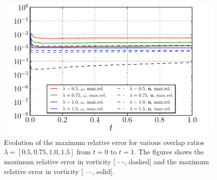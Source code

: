 	\begin{figure}[!p]
	\centering
	\includegraphics[width=0.6\linewidth]{./figures/validation/lambOseen/lambOseen_parameter_overlap.pdf}
	\caption{Evolution of the maximum relative error for various overlap ratios $\lambda = [0.5, 0.75, 1.0, 1.5]$ from $t=0$ to $t=1$. The figures shows the maximum relative error in vorticity [ - -, dashed] and the maximum relative error in vorticity [ ---, solid].}
	\label{fig:lambOseen_parameter_overlap}
	\end{figure}		

